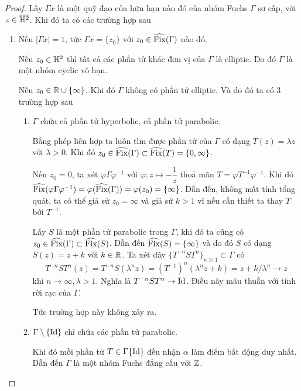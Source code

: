 \begin{proof}
    Lấy $\Gamma x$ là một quỹ đạo của hữu hạn nào đó của nhóm Fuchs $\Gamma$ sơ cấp, với $z \in \overline{\mathbb{H}^2}$.
    Khi đó ta có các trường hợp sau
    \begin{enumerate}
        \item Nếu $|\Gamma x| = 1$, tức $\Gamma x = \{z_0\}$ với $z_0 \in \widehat{\operatorname{Fix}}(\Gamma)$ nào đó.

        Nếu $z_0 \in \mathbb{H}^2$ thì tất cả các phần tử khác đơn vị của $\Gamma$ là elliptic. Do đó $\Gamma$ là một nhóm cyclic vô hạn.

        Nếu $z_0 \in \mathbb{R} \cup \{\infty\}$. Khi đó $\Gamma$ không có phần tử elliptic. Và do đó ta có 3 trường hợp sau
        \begin{enumerate}
            \item $\Gamma$ chứa cả phần tử hyperbolic, cả phần tử parabolic.

            Bằng phép liên hợp ta luôn tìm được phần tử của $\Gamma$ có dạng $T(z) = \lambda z$ với $\lambda >0$. Khi đó $z_0 \in \widehat{\operatorname{Fix}}(\Gamma) \subset \widehat{\operatorname{Fix}}(T) = \{0, \infty\}$. 

            Nếu $z_0 = 0$, ta xét  $\varphi\Gamma \varphi^{-1} $ với $\varphi: z\mapsto -\dfrac{1}{z}$ thoả mãn $T = \varphi T^{-1}\varphi^{-1}$. Khi đó $\widehat{\operatorname{Fix}}(\varphi\Gamma \varphi^{-1}) = \varphi(\widehat{\operatorname{Fix}}(\Gamma)) = \varphi(z_0) = \{\infty\}$. 
            Dẫn đến, không mất tính tổng quát, ta có thể giả sử $z_0 = \infty$ và giả sử $k > 1$ vì nếu cần thiết ta thay $T$ bởi $T^{-1}$.  

            Lấy $S$ là một phần tử parabolic trong $\Gamma$, khi đó ta cũng có $z_0 \in \widehat{\operatorname{Fix}}(\Gamma) \subset \widehat{\operatorname{Fix}}(S)$. 
            Dẫn đến $\widehat{\operatorname{Fix}}(S) = \{\infty\}$ và do đó $S$ có dạng $S(z) = z+k$ với $k \in \mathbb{R}$. Ta xét dãy $\{T^{-n}ST^n\}_{n \geq 1} \subset \Gamma$ có 
            \[T^{-n}ST^n(z) = T^{-n}S(\lambda^n z) = (T^{-1})^n(\lambda^n z +k )= z + k/\lambda^n \to z \]
            khi  $n \to \infty, \lambda > 1$. Nghĩa là $T^{-n}ST^n \to \operatorname{Id}$. Điều này mâu thuẫn với tính rời rạc của $\Gamma$. 
            
            Tức trường hợp này không xảy ra.
            
            \item $\Gamma\setminus \{\operatorname{Id}\}$ chỉ chứa các phần tử parabolic.

            Khi đó mỗi phần tử $T \in \Gamma \{\operatorname{Id}\}$ đều nhận $\alpha$ làm điểm bất động duy nhất. Dẫn đến $\Gamma$ là một nhóm Fuchs đẳng cấu với $\mathbb{Z}$. 


\end{enumerate}
\end{enumerate}
\end{proof}
